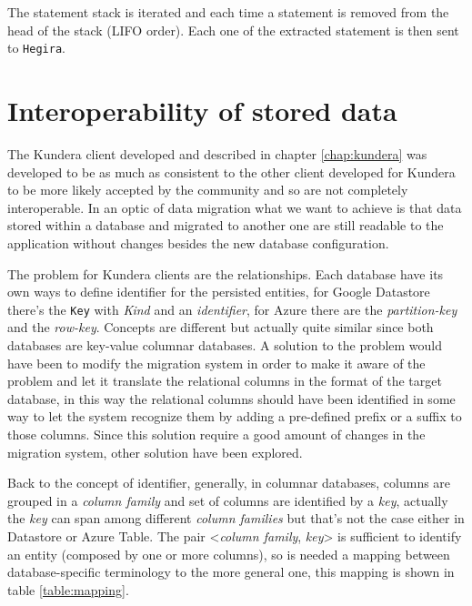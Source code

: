 \noindent The statement stack is iterated and each time a statement is removed from the head of the stack (LIFO order). Each one of the extracted statement is then sent to \texttt{Hegira}.


\section{Interoperability of stored data}
\label{sec:data-interoperability}
The Kundera client developed and described in chapter \ref{chap:kundera} was developed to be as much as consistent to the other client developed for Kundera to be more likely accepted by the community and so are not completely interoperable.
In an optic of data migration what we want to achieve is that data stored within a database and migrated to another one are still readable to the application without changes besides the new database configuration. 

\noindent The problem for Kundera clients are the relationships. Each database have its own ways to define identifier for the persisted entities, for Google Datastore there's the \texttt{Key} with \textit{Kind} and an \textit{identifier}, for Azure there are the \textit{partition-key} and the \textit{row-key}. Concepts are different but actually quite similar since both databases are key-value columnar databases. 
A solution to the problem would have been to modify the migration system in order to make it aware of the problem and let it translate the relational columns in the format of the target database, in this way the relational columns should have been identified in some way to let the system recognize them by adding a pre-defined prefix or a suffix to those columns.
Since this solution require a good amount of changes in the migration system, other solution have been explored.
 
\newparagraph Back to the concept of identifier, generally, in columnar databases, columns are grouped in a \textit{column family} and set of columns are identified by a \textit{key}, actually the \textit{key} can span among different \textit{column families} but that's not the case either in Datastore or Azure Table.
The pair \textless\textit{column family}, \textit{key}\textgreater
is sufficient to identify an entity (composed by one or more columns), so is needed a mapping between database-specific terminology to the more general one, this mapping is shown in table \ref{table:mapping}.

